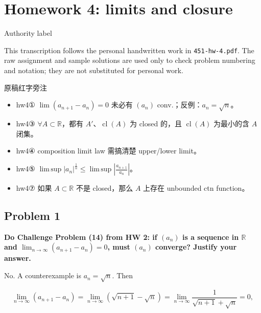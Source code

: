 \chapter{Homework 4: limits and closure}

\begin{qlremark}{Authority label}

This transcription follows the personal handwritten work in \texttt{451-hw-4.pdf}. The raw assignment and sample solutions are used only to check problem numbering and notation; they are not substituted for personal work.

\end{qlremark}

\begin{qlremark}{原稿红字旁注}

\begin{itemize}
\tightlist
\item
  hw4① \(\lim\left( {a_{n + 1} - a_{n}} \right) = 0\) 未必有 \(\left( a_{n} \right)\) conv.；反例：\(a_{n} = \sqrt{n}\)。
\item
  hw4③ \(\forall A \subset \mathbb{R}\)，都有 \(A'\)、\(\operatorname{cl}(A)\) 为 closed 的，且 \(\operatorname{cl}(A)\) 为最小的含 \(A\) 闭集。
\item
  hw4④ composition limit law 需搞清楚 upper/lower limit。
\item
  hw4⑤ \(\operatorname{lim\, sup}\left| a_{n} \right|^{\frac{1}{n}} \leq \operatorname{lim\, sup}\left| \frac{a_{n + 1}}{a_{n}} \right|\)。
\item
  hw4⑦ 如果 \(A \subset \mathbb{R}\) 不是 closed，那么 \(A\) 上存在 unbounded ctn function。
\end{itemize}

\end{qlremark}

\section{Problem 1}

\textbf{Do Challenge Problem (14) from HW 2: if \(\left( a_{n} \right)\) is a sequence in \(\mathbb{R}\) and \(\lim_{n\rightarrow\infty}\left( {a_{n + 1} - a_{n}} \right) = 0\), must \(\left( a_{n} \right)\) converge? Justify your answer.}

No. A counterexample is \(a_{n} = \sqrt{n}\). Then

\[\lim\limits_{n\rightarrow\infty}\left( {a_{n + 1} - a_{n}} \right) = \lim\limits_{n\rightarrow\infty}\left( {\sqrt{n + 1} - \sqrt{n}} \right) = \lim\limits_{n\rightarrow\infty}\frac{1}{\sqrt{n + 1} + \sqrt{n}} = 0,\]

